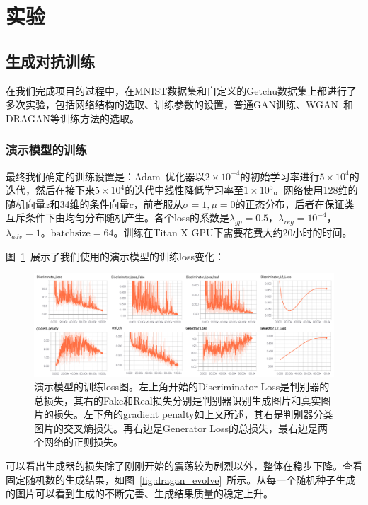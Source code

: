 \documentclass[a4paper,12pt,UTF8]{ctexart}
\newcommand{\kai}{\CJKfamily{zhkai}}	%
\begin{document}
\section{实验}
\subsection{生成对抗训练}

在我们完成项目的过程中，在MNIST数据集和自定义的Getchu数据集上都进行了多次实验，包括网络结构的选取、训练参数的设置，普通GAN训练、WGAN~\cite{2017arXiv170107875A}和DRAGAN等训练方法的选取。

\subsubsection{演示模型的训练}


最终我们确定的训练设置是：Adam~\cite{Kingma2014Adam}优化器以$2 \times 10^{-4}$的初始学习率进行$5 \times 10^{4}$的迭代，然后在接下来$5 \times 10^{4}$的迭代中线性降低学习率至$1 \times 10^{5}$。网络使用128维的随机向量$z$和34维的条件向量$c$，前者服从$\sigma=1, \mu=0$的正态分布，后者在保证类互斥条件下由均匀分布随机产生。各个loss的系数是$\lambda_{gp}=0.5$，$\lambda_{reg}=10^{-4}$，$\lambda_{adv}=1$。$\mathrm{batchsize}=64$。训练在Titan X GPU下需要花费大约20小时的时间。

图~\ref{fig:goodmodel_dragan}~展示了我们使用的演示模型的训练loss变化：

\begin{figure}[H]
  \centering
  \includegraphics[width=1\linewidth]{figs/good_model_dragan.png}
  \caption{\kai 演示模型的训练loss图。左上角开始的Discriminator Loss是判别器的总损失，其右的Fake和Real损失分别是判别器识别生成图片和真实图片的损失。左下角的gradient penalty如上文所述，其右是判别器分类图片的交叉熵损失。再右边是Generator Loss的总损失，最右边是两个网络的正则损失。}
  \label{fig:goodmodel_dragan}
\end{figure}

可以看出生成器的损失除了刚刚开始的震荡较为剧烈以外，整体在稳步下降。查看固定随机数的生成结果，如图~\ref{fig:dragan_evolve}~所示。从每一个随机种子生成的图片可以看到生成的不断完善、生成结果质量的稳定上升。
\end{document}
